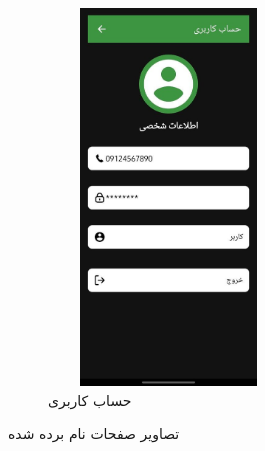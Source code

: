\documentclass{report}
\begin{document}
\begin{figure}[ht]
\begin{subfigure}[b]{0.3\textwidth}
		\includegraphics[width=0.7\textwidth,height=10cm,keepaspectratio]{Pic/profile}
		\caption{حساب کاربری}
		\label{fig:signup}
	\end{subfigure}
	\caption{تصاویر صفحات نام برده شده}
	\label{fig:androidPages}
\end{figure}


 
\end{document}
